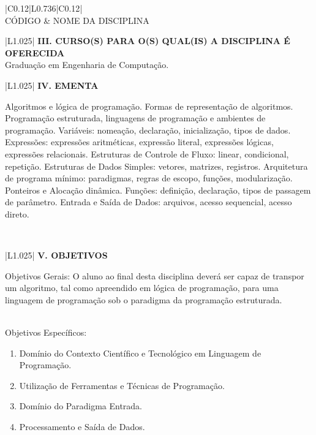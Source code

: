 \documentclass[12pt]{article}
\newcommand{\requisitoA}{}
\newcommand{\requisitoB}{}
\newcommand{\requisitoC}{}
\newcommand{\cursoA}{Graduação em Engenharia de Computação. \\ \hline}
\newcommand{\cursoB}{}
\newcommand{\cursoC}{}
\newcommand{\ementa}{

Algoritmos e lógica de programação. Formas de representação de algoritmos. Programação estruturada, linguagens de programação e ambientes de programação. Variáveis: nomeação, declaração, inicialização, tipos de dados. Expressões: expressões aritméticas, expressão literal, expressões lógicas, expressões relacionais. Estruturas de Controle de Fluxo: linear, condicional, repetição. Estruturas de Dados Simples: vetores, matrizes, registros. Arquitetura de programa mínimo: paradigmas, regras de escopo, funções, modularização. Ponteiros e Alocação dinâmica. Funções: definição, declaração, tipos de passagem de parâmetro. Entrada e Saída de Dados: arquivos, acesso sequencial, acesso direto.

 \\ \hline
}
\begin{document}
\begin{longtable}{|C{0.12\textwidth}|L{0.736\textwidth}|C{0.12\textwidth}|} \hline
%
 \\ \hline
%
CÓDIGO & NOME DA DISCIPLINA \\ \hline	
%
\requisitoA
\requisitoB
\requisitoC
\end{longtable}


\begin{longtable}{|L{1.025\textwidth}|} \hline
%
{\bf III. CURSO(S) PARA O(S) QUAL(IS) A DISCIPLINA É OFERECIDA } \\ \hline
%
\cursoA 
\cursoB
\cursoC

\end{longtable}

\begin{longtable}{|L{1.025\textwidth}|} \hline
%
{\bf IV. EMENTA } \\ \hline
%
\ementa
\end{longtable}

\newpage



\begin{longtable}{|L{1.025\textwidth}|} \hline
%
{\bf V. OBJETIVOS } \\ \hline
%

Objetivos Gerais: O aluno ao final desta disciplina deverá ser capaz de transpor um algoritmo, tal como apreendido em lógica de programação, para uma linguagem de programação sob o paradigma da programação estruturada.

\\

Objetivos Específicos:
\begin{enumerate}
\item  Domínio do Contexto Científico e Tecnológico em Linguagem de Programação.
\item Utilização de Ferramentas e Técnicas de Programação.
\item Domínio do Paradigma Entrada.
\item Processamento e Saída de Dados.

\end{enumerate}

\\ \hline
\end{longtable}
\end{document}
